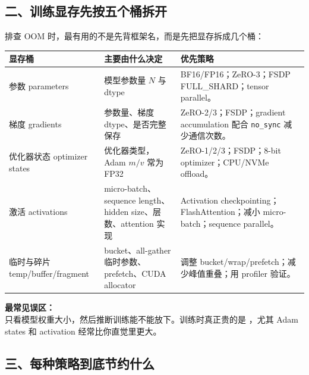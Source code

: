 \subsection{二、训练显存先按五个桶拆开}

排查 OOM 时，最有用的不是先背框架名，而是先把显存拆成几个桶：

\begin{center}
{\small
\begin{tabular}{p{3.4cm}p{5.2cm}p{4.4cm}}
\hline
\textbf{显存桶} & \textbf{主要由什么决定} & \textbf{优先策略} \\
\hline
参数 parameters & 模型参数量 $N$ 与 dtype & BF16/FP16；ZeRO-3；FSDP FULL\_SHARD；tensor parallel。 \\
梯度 gradients & 参数量、梯度 dtype、是否完整保存 & ZeRO-2/3；FSDP；gradient accumulation 配合 \texttt{no\_sync} 减少通信次数。 \\
优化器状态 optimizer states & 优化器类型，Adam $m/v$ 常为 FP32 & ZeRO-1/2/3；FSDP；8-bit optimizer；CPU/NVMe offload。 \\
激活 activations & micro-batch、sequence length、hidden size、层数、attention 实现 & Activation checkpointing；FlashAttention；减小 micro-batch；sequence parallel。 \\
临时与碎片 temp/buffer/fragment & bucket、all-gather 临时参数、prefetch、CUDA allocator & 调整 bucket/wrap/prefetch；减少峰值重叠；用 profiler 验证。 \\
\hline
\end{tabular}
}
\end{center}

\begin{warnbox}
\textbf{最常见误区：}\\
只看模型权重大小，然后推断训练能不能放下。训练时真正贵的是 ，尤其 Adam states 和 activation 经常比你直觉里更大。
\end{warnbox}

\subsection{三、每种策略到底节约什么}

